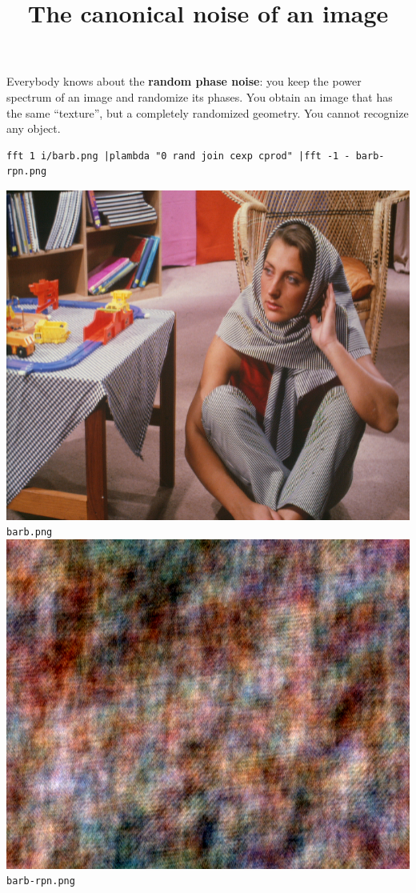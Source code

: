 \title{The canonical noise of an image}

Everybody knows about the {\bf random phase noise}: you keep the power
spectrum of an image and randomize its phases.  You obtain an image that has
the same ``texture'', but a completely randomized geometry.  You cannot
recognize any object.

\begin{verbatim}
fft 1 i/barb.png |plambda "0 rand join cexp cprod" |fft -1 - barb-rpn.png
\end{verbatim}
\includegraphics{i/barb.png}{\small\tt barb.png}\\
\includegraphics{barb-rpn.png}{\small\tt barb-rpn.png}

